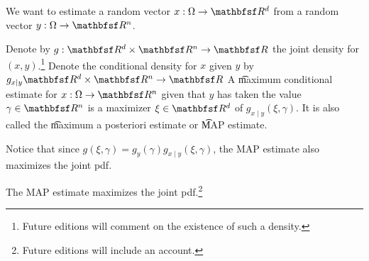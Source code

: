 

We want to estimate a random vector $x: \Omega \to \R^d$ from a random vector $y: \Omega \to \R^n$.


Denote by $g: \R^d \times \R^n \to \R$ the joint density for $(x, y)$.\footnote{Future editions will comment on the existence of such a density.}
Denote the conditional density for $x$ given $y$ by $g_{x \mid y} \R^d \times \R^n \to \R$
A \t{maximum conditional estimate} for $x: \Omega \to \R^n$ given that $y$ has taken the value $\gamma \in \R^n$ is a maximizer $\xi \in \R^d$ of $g_{x \mid y}(\xi, \gamma)$.
It is also called the \t{maximum a posteriori estimate} or \t{MAP estimate}.


Notice that since $g(\xi, \gamma) = g_y(\gamma) g_{x \mid y}(\xi, \gamma)$, the MAP estimate also maximizes the joint pdf.

\begin{proposition}
  The MAP estimate maximizes the joint pdf.\footnote{Future editions will include an account.}
\end{proposition}


\blankpage

